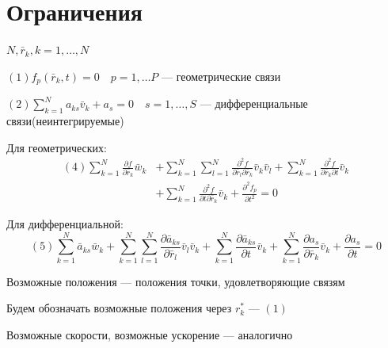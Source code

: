 \documentclass[crop=false]{standalone}
\begin{document}
\section{Ограничения}
$N, \bar r_k, k = 1, \dots , N$

$(1) f_p(\bar r_k ,t) =0 \quad p = 1, \dots P$ — геометрические связи

$(2) \sum_{k=1}^N a_{k s} \bar v_k + a_s = 0 \quad s = 1, \dots , S$ — дифференциальные связи(неинтегрируемые)

Для геометрических:
\TwoCols{
\[\frac{d}{dt} f_p(\bar r_k, t)= 0\]
\[(3) \sum_{k=1}^N \frac{\partial f_p}{\partial \bar r_k} \bar v_k + \frac{\partial f_p}{\partial t} = 0\]
\[\sum_{k=1}^N \frac{\partial f_p}{\partial \bar r_k} \bar v_k = \begin{pmatrix}
    \frac{\partial f_p }{\partial x_k} \\
    \frac{\partial f_p }{\partial y_k} \\
    \frac{\partial f_p}{\partial y_k}
\end{pmatrix}
\cdot 
\begin{pmatrix}
    v_{x_k} \\
    v_{y_k} \\
    v_{z_k}
\end{pmatrix}
\]
}
{
    \[
    \begin{aligned}
    (4) \sum_{k=1}^N \frac{\partial f}{\partial \bar r_k} \bar w_k &+ \sum_{k=1}^N \sum_{l = 1}^{N} \frac{\partial^2 f}{\partial \bar r_l \partial \bar r_k} \bar v_k \bar v_l + \sum_{k=1}^{N} \frac{\partial^2 f}{\partial \bar r_k \partial t} \bar v_k \\ &+ \sum_{k=1}^{N} \frac{\partial^2 f}{\partial t \partial \bar r_k} \bar v_k + \frac{\partial^2 f_p }{\partial t^2} = 0
    \end{aligned}
    \]
}

Для дифференциальной: 
\[(5) \sum_{k=1}^N \bar a_{k s} \bar w_k + \sum_{k=1}^N \sum_{l=1}^N \frac{\partial \bar a_{k s}}{\partial \bar r_l} \bar v_l \bar v_k + \sum_{k=1}^N \frac{\partial \bar a_{k s}}{\partial t} \bar v_k + \sum_{k=1}^N \frac{\partial a_{s}}{\partial \bar r_k} \bar v_k + \frac{\partial a_s}{\partial t} = 0\]

\Def Возможные положения — положения точки, удовлетворяющие связям

Будем обозначать возможные положения через $r_k^*$ — $(1)$

\Def Возможные скорости, возможные ускорение — аналогично
\end{document}
